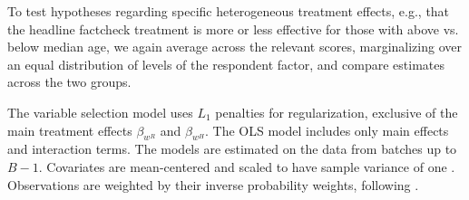 \documentclass[letterpaper, 12pt, parskip=full,]{scrartcl}
\begin{document}
To test hypotheses regarding specific heterogeneous treatment effects, e.g., that the headline factcheck treatment is more or less effective for those with above vs. below median age, we again average across the relevant scores, marginalizing over an equal distribution of levels of the respondent factor, and compare estimates across the two groups.


% 

The variable selection model uses $L_{1}$ penalties for regularization, exclusive of the main treatment effects $\beta_{w^R}$ and $\beta_{w^H}$. The OLS model includes only main effects and interaction terms. The models are estimated on the data from batches up to $B-1$. Covariates are mean-centered and scaled to have sample variance of one \citep{marquardt1980you}. Observations are weighted by their inverse probability weights, following \cite{vanderweele2010marginal}. %
\end{document}

